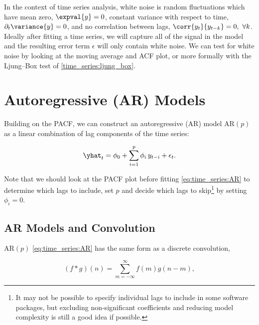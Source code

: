 In the context of time series analysis, white noise is random fluctuations which
have mean zero, $\expval{y} = 0$,
constant variance with respect to time, $\partial_{t} \variance{y} = 0$,
and no correlation between lags, $\corr{y_{t}}{y_{t-k}} = 0,\,\, \forall k$.
Ideally after fitting a time series, we will capture all of the signal
in the model and the resulting error term $\epsilon$ will only contain white noise.
We can test for white noise by looking at the moving average and ACF plot,
or more formally with the Ljung--Box test of \cref{time_series:ljung_box}.

\section{Autoregressive (AR) Models}
\label{time_series:AR}
Building on the PACF, we can construct an autoregressive (AR) model $\text{AR}\left(p\right)$
as a linear combination of lag components of the time series:

\begin{equation}\label{eq:time_series:AR}
\yhat_{t} = \phi_{0} + \sum_{i=1}^{p} \phi_{i}\, y_{t-i} + \epsilon_{t}.
\end{equation}

Note that we should look at the PACF plot before fitting \cref{eq:time_series:AR}
to determine which lags to include,
\ie set $p$ and decide which lags to skip\footnote{It may not be possible
to specify individual lags to include in some software packages,
but excluding non-significant coefficients and reducing model complexity
is still a good idea if possible.} by setting $\phi_{i} = 0$.

\subsection{AR Models and Convolution}
\label{time_series:AR:convolution}
$\text{AR}\left(p\right)$ \cref{eq:time_series:AR} has the same
form as a discrete convolution,

\begin{equation}\label{eq:time_series:AR:convolution}
\left(f*g\right)\left(n\right) = \sum_{m=-\infty}^{\infty} f\left(m\right) g\left(n-m\right),
\end{equation}

